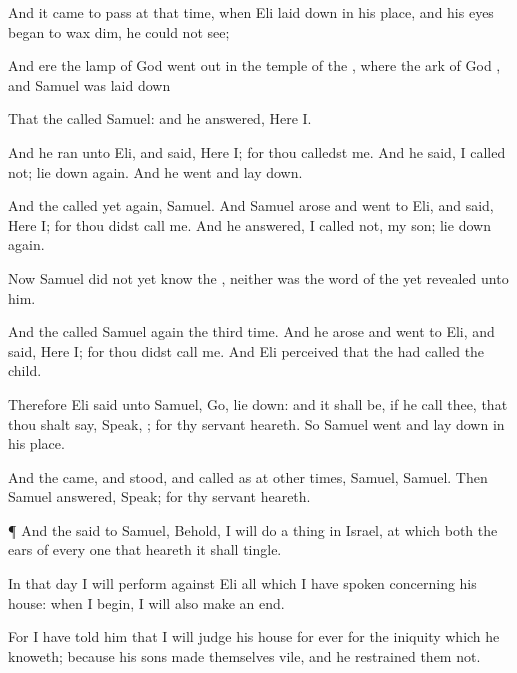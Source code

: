 {And it came to pass at that
time, when
Eli
{} laid
down in his
place, and his
eyes
began to wax
dim,
{} he
could not
see;

And ere the
lamp of
God went
out in the
temple of the
{}, where the
ark of
God
{}, and
Samuel was laid
down
{}

That the
{}
called
Samuel: and he
answered, Here
{} I.

And he
ran unto
Eli, and
said, Here
{}
I; for thou
calledst me. And he
said, I
called not; lie
down
again. And he
went and lay
down.

And the
{}
called yet
again,
Samuel. And
Samuel
arose and
went to
Eli, and
said, Here
{} I; for thou didst
call me. And he
answered, I
called not, my
son; lie
down
again.

Now
Samuel did not
yet
know the
{}, neither was the
word of the
{} yet
revealed unto him.

And the
{}
called
Samuel
again the third
time. And he
arose and
went to
Eli, and
said, Here
{} I; for thou didst
call me. And
Eli
perceived that the
{} had
called the
child.

Therefore
Eli
said unto
Samuel,
Go, lie
down: and it shall be, if he
call thee, that thou shalt
say,
Speak,
{}; for thy
servant
heareth. So
Samuel
went and lay
down in his
place.

And the
{}
came, and
stood, and
called as at other
times,
Samuel,
Samuel. Then
Samuel
answered,
Speak; for thy
servant
heareth.


\par }{\PP {}¶ And the
{}
said to
Samuel, Behold, I will
do a
thing in
Israel, at which
both the
ears of every one that
heareth it shall
tingle.

In that
day I will
perform against
Eli all
{} which I have
spoken
concerning his
house: when I
begin, I will also make an
end.

For I have
told him that I will
judge his
house
for
ever for the
iniquity which he
knoweth; because his
sons made themselves
vile, and he
restrained them not.

}
